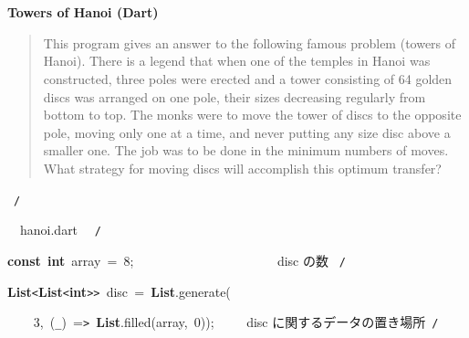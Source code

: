 \documentclass[a4paper,10pt]{article}
\def\mc{\relax}
\begin{document}
\tt\mc 

\noindent
\mbox{}\rm\mc {\tt /}{\tt *}\  \hrulefill *
\tt\mc 

\noindent
\mbox{}\hfill

\noindent
\mbox{}\rm\mc \ %

\centerline{\bf Towers of Hanoi (Dart)}

\begin{quote}

This program gives an answer to the following famous problem (towers of
Hanoi).
There is a legend that when one of the temples in Hanoi was constructed,
three poles were erected and a tower consisting of 64 golden discs was
arranged on one pole, their sizes decreasing regularly from bottom to top.
The monks were to move the tower of discs to the opposite pole, moving
only one at a time, and never putting any size disc above a smaller one.
The job was to be done in the minimum numbers of moves. What strategy for
moving discs will accomplish this optimum transfer?
\end{quote}

\tt\mc 

\noindent
\mbox{}\hfill

\noindent
\mbox{}\rm\mc {\tt *} \hrulefill \rm\mc \ {\tt *}{\tt /}
\tt\mc 

\noindent
\mbox{}\hfill

\noindent
\mbox{}\rm\mc {\tt /}{\tt *}\  \hrulefill\ hanoi.dart \ \hrulefill \rm\mc \ {\tt *}{\tt /}
\tt\mc 

\noindent
\mbox{}\hfill

\noindent
\mbox{}\textbf{const}{\tt\mc \ }\textbf{int}{\tt\mc \ }array{\tt\mc \ }={\tt\mc \ }8;{\tt\mc \ }{\tt\mc \ }{\tt\mc \ }{\tt\mc \ }{\tt\mc \ }{\tt\mc \ }{\tt\mc \ }{\tt\mc \ }{\tt\mc \ }{\tt\mc \ }{\tt\mc \ }{\tt\mc \ }{\tt\mc \ }{\tt\mc \ }{\tt\mc \ }{\tt\mc \ }{\tt\mc \ }{\tt\mc \ }{\tt\mc \ }{\tt\mc \ }\rm\mc {\tt /}{\tt *}\  \ disc の数 \hfill \rm\mc \ {\tt *}{\tt /}
\tt\mc 

\noindent
\mbox{}\hfill

\noindent
\mbox{}\textbf{List}{\tt <}\textbf{List}{\tt <}\textbf{int}{\tt >}{\tt >}{\tt\mc \ }disc{\tt\mc \ }={\tt\mc \ }\textbf{List}.generate(

\noindent
\mbox{}{\tt\mc \ }{\tt\mc \ }{\tt\mc \ }{\tt\mc \ }3,{\tt\mc \ }({\tt\_}){\tt\mc \ }={\tt >}{\tt\mc \ }\textbf{List}.filled(array,{\tt\mc \ }0));{\tt\mc \ }{\tt\mc \ }{\tt\mc \ }\rm\mc {\tt /}{\tt *}\  \ disc に関するデータの置き場所\hfill \rm\mc \ {\tt *}{\tt /}
\tt\mc 
\end{document}
